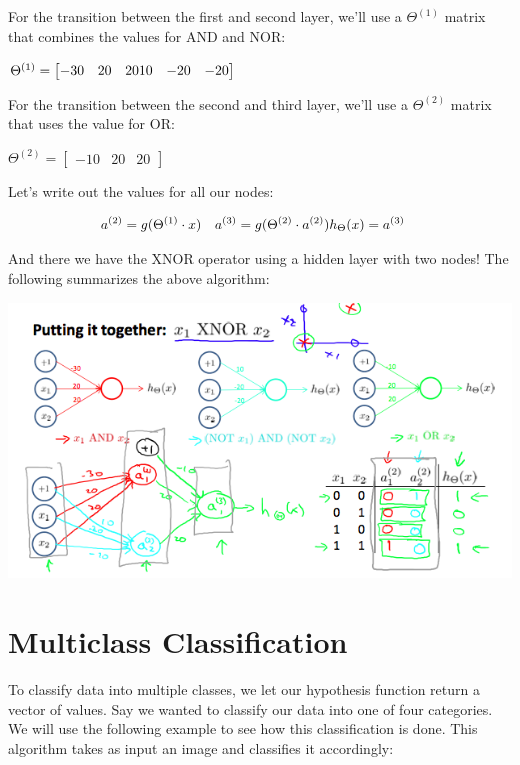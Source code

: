 \documentclass[
]{book}
\begin{document}
For the transition between the first and second layer, we'll use a \(Θ^{(1)}\) matrix that combines the values for AND and NOR:

\(\Theta^{(1)} =\begin{bmatrix}-30 & 20 & 20 \newline 10 & -20 & -20\end{bmatrix}\)

For the transition between the second and third layer, we'll use a \(Θ^{(2)}\) matrix that uses the value for OR:

\(\Theta^{(2)} =\begin{bmatrix}-10 & 20 & 20\end{bmatrix}\)

Let's write out the values for all our nodes:

\begin{align}& a^{(2)} = g(\Theta^{(1)} \cdot x) \newline& a^{(3)} = g(\Theta^{(2)} \cdot a^{(2)}) \newline& h_\Theta(x) = a^{(3)}\end{align}

And there we have the XNOR operator using a hidden layer with two nodes! The following summarizes the above algorithm:

\includegraphics{NN_example_3.png}

\hypertarget{multiclass-classification}{%
\section{Multiclass Classification}\label{multiclass-classification}}

To classify data into multiple classes, we let our hypothesis function return a vector of values. Say we wanted to classify our data into one of four categories. We will use the following example to see how this classification is done. This algorithm takes as input an image and classifies it accordingly:
\end{document}
